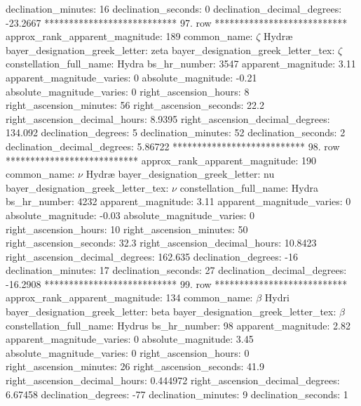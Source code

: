                declination_minutes: 16
               declination_seconds: 0
       declination_decimal_degrees: -23.2667
*************************** 97. row ***************************
    approx_rank_apparent_magnitude: 189
                       common_name: $\zeta$ Hydr{\ae}
    bayer_designation_greek_letter: zeta
bayer_designation_greek_letter_tex: $\zeta$
           constellation_full_name: Hydra
                      bs_hr_number: 3547
                apparent_magnitude: 3.11
         apparent_magnitude_varies: 0
                absolute_magnitude: -0.21
         absolute_magnitude_varies: 0
             right_ascension_hours: 8
           right_ascension_minutes: 56
           right_ascension_seconds: 22.2
     right_ascension_decimal_hours: 8.9395
   right_ascension_decimal_degrees: 134.092
               declination_degrees: 5
               declination_minutes: 52
               declination_seconds: 2
       declination_decimal_degrees: 5.86722
*************************** 98. row ***************************
    approx_rank_apparent_magnitude: 190
                       common_name: $\nu$ Hydr{\ae}
    bayer_designation_greek_letter: nu
bayer_designation_greek_letter_tex: $\nu$
           constellation_full_name: Hydra
                      bs_hr_number: 4232
                apparent_magnitude: 3.11
         apparent_magnitude_varies: 0
                absolute_magnitude: -0.03
         absolute_magnitude_varies: 0
             right_ascension_hours: 10
           right_ascension_minutes: 50
           right_ascension_seconds: 32.3
     right_ascension_decimal_hours: 10.8423
   right_ascension_decimal_degrees: 162.635
               declination_degrees: -16
               declination_minutes: 17
               declination_seconds: 27
       declination_decimal_degrees: -16.2908
*************************** 99. row ***************************
    approx_rank_apparent_magnitude: 134
                       common_name: $\beta$ Hydri
    bayer_designation_greek_letter: beta
bayer_designation_greek_letter_tex: $\beta$
           constellation_full_name: Hydrus
                      bs_hr_number: 98
                apparent_magnitude: 2.82
         apparent_magnitude_varies: 0
                absolute_magnitude: 3.45
         absolute_magnitude_varies: 0
             right_ascension_hours: 0
           right_ascension_minutes: 26
           right_ascension_seconds: 41.9
     right_ascension_decimal_hours: 0.444972
   right_ascension_decimal_degrees: 6.67458
               declination_degrees: -77
               declination_minutes: 9
               declination_seconds: 1

